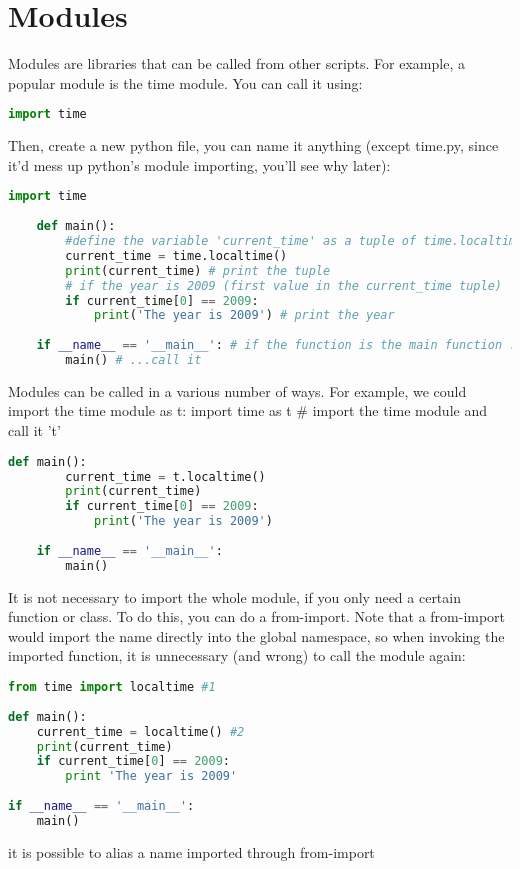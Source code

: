 	\section{Modules}
	Modules are libraries that can be called from other scripts. For example, a
	popular module is the time module. You can call it using:
	\lstset{basicstyle=\scriptsize, numbers=left, captionpos=b, tabsize=4}
	\begin{lstlisting}[caption=Basic Import,language={Python},
	xleftmargin=15pt, label=lst:basicimport]
	import time
	\end{lstlisting}

	Then, create a new python file, you can name it anything (except time.py, since
	it'd mess up python's module importing, you'll see why later):
	\lstset{basicstyle=\scriptsize, numbers=left, captionpos=b, tabsize=4}
	\begin{lstlisting}[caption=Name imported Module 1,language={Python},
	xleftmargin=15pt, label=lst:nameimportedmodule1]
	import time
	 
	def main():
		#define the variable 'current_time' as a tuple of time.localtime()
		current_time = time.localtime() 
		print(current_time) # print the tuple
		# if the year is 2009 (first value in the current_time tuple)
		if current_time[0] == 2009: 
			print('The year is 2009') # print the year
	 
	if __name__ == '__main__': # if the function is the main function ...
		main() # ...call it
	\end{lstlisting}

	Modules can be called in a various number of ways. For example, we could import
	the time module as t: import time as t \# import the time module and call it 't'
	\lstset{basicstyle=\scriptsize, numbers=left, captionpos=b, tabsize=4}
	\begin{lstlisting}[caption=Name imported Module 2,language={Python},
	xleftmargin=15pt, label=lst:nameimportedmodule2]
	def main():
		current_time = t.localtime() 
		print(current_time)
		if current_time[0] == 2009: 
			print('The year is 2009')
	 
	if __name__ == '__main__': 
		main()
	\end{lstlisting}

	It is not necessary to import the whole module, if you only need a certain
	function or class. To do this, you can do a from-import. Note that a from-import
	would import the name directly into the global namespace, so when invoking the
	imported function, it is unnecessary (and wrong) to call the module again:
\lstset{basicstyle=\scriptsize, numbers=left, captionpos=b, tabsize=4}
\begin{lstlisting}[caption=Select Import,language={Python},
xleftmargin=15pt, label=lst:selectimport]
from time import localtime #1
 
def main():
    current_time = localtime() #2
    print(current_time)
    if current_time[0] == 2009: 
        print 'The year is 2009'
 
if __name__ == '__main__': 
    main()
\end{lstlisting}
it is possible to alias a name imported through from-import

